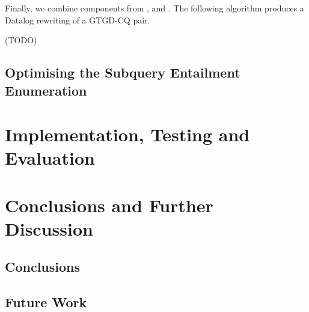 \documentclass[12pt]{report}
\theoremstyle{plain}
\theoremstyle{definition}
\begin{document}
Finally, we combine components from ,  and . The following algorithm produces a Datalog rewriting of a GTGD-CQ pair.

(TODO)

\section{Optimising the Subquery Entailment Enumeration}
\label{secomputation-optimisations}


\newpage
\chapter{Implementation, Testing and Evaluation}




\newpage
\chapter{Conclusions and Further Discussion}

\section{Conclusions}

\section{Future Work}


\printbibliography
\end{document}
